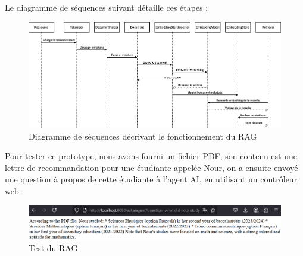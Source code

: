 \documentclass[12pt,a4paper]{report}
\begin{document}
	Le diagramme de séquences suivant détaille ces étapes :
	
	\begin{figure}[H]
		\centering
		\includegraphics[width=\textwidth]{ds-rag.drawio.png}
		\caption{Diagramme de séquences décrivant le fonctionnement du RAG}
		\label{fig:ds-rag.drawio}
	\end{figure}
	
	Pour tester ce prototype, nous avons fourni un fichier PDF, son contenu est une lettre de recommandation pour une étudiante appelée Nour, on a ensuite envoyé une question à propos de cette étudiante à l'agent AI, en utilisant un contrôleur web :
	
	\begin{figure}[H]
		\centering
		\includegraphics[width=\textwidth]{test-rag.png}
		\caption{Test du RAG}
		\label{fig:test-rag}
	\end{figure}
	
	
	
\end{document}
